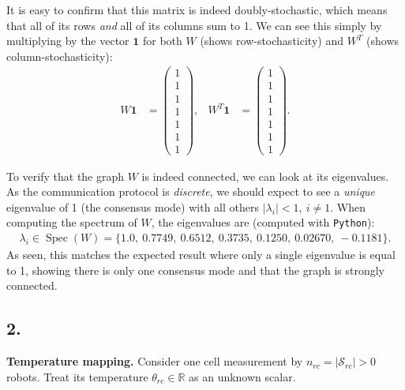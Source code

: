 \documentclass[12pt]{article}
\DeclareMathOperator{\spec}{Spec}
\begin{document}
It is easy to confirm that this matrix is indeed doubly-stochastic, which means that all of its rows \textit{and} all of its columns sum to 1. We can see this simply by multiplying by the vector $\mathbf1$ for both $W$ (shows row-stochasticity) and $W^T$ (shows column-stochasticity):
\begin{align*}
    W\mathbf1&=\begin{pmatrix}
        1\\1\\1\\1\\1\\1\\1
    \end{pmatrix}, & W^T\mathbf1&=\begin{pmatrix}
        1\\1\\1\\1\\1\\1\\1
    \end{pmatrix}.
\end{align*}

To verify that the graph $W$ is indeed connected, we can look at its eigenvalues. As the communication protocol is \textit{discrete}, we should expect to see a \textit{unique} eigenvalue of 1 (the consensus mode) with all others $|\lambda_i|<1,\ i\neq1$. When computing the spectrum of $W$, the eigenvalues are (computed with \texttt{Python}):
\begin{align*}
    \lambda_i\in\spec(W)=\{1.0,\ 0.7749,\ 0.6512,\ 0.3735,\ 0.1250,\ 0.02670,\ -0.1181\}.
\end{align*}
As seen, this matches the expected result where only a single eigenvalue is equal to 1, showing there is only one consensus mode and that the graph is strongly connected.

\clearpage
\subsection*{2.}
\textbf{Temperature mapping.}
Consider one cell measurement by $n_{rc}=|\mathcal S_{rc}|>0$ robots. Treat its temperature $\theta_{rc}\in\mathbb R$ as an unknown scalar.
\end{document}
